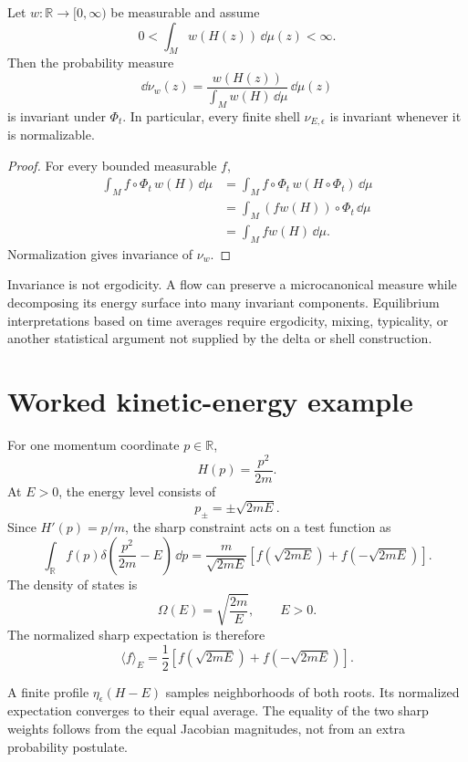 \documentclass[11pt]{article}
\begin{document}
\begin{theorem}
\label{thm:invariance}
Let \(w:\mathbb R\to[0,\infty)\) be measurable and assume
\[
0<\int_M w(H(z))\,\dd\mu(z)<\infty.
\]
Then the probability measure
\[
\dd\nu_w(z)
=
\frac{w(H(z))}
{\int_Mw(H)\,\dd\mu}\,\dd\mu(z)
\]
is invariant under \(\Phi_t\). In particular, every finite shell
\(\nu_{E,\epsilon}\) is invariant whenever it is normalizable.
\end{theorem}

\begin{proof}
For every bounded measurable \(f\),
\begin{align*}
\int_M f\circ\Phi_t\,w(H)\,\dd\mu
&=
\int_M f\circ\Phi_t\,w(H\circ\Phi_t)\,\dd\mu\\
&=
\int_M (fw(H))\circ\Phi_t\,\dd\mu\\
&=
\int_M fw(H)\,\dd\mu.
\end{align*}
Normalization gives invariance of \(\nu_w\).
\end{proof}

Invariance is not ergodicity. A flow can preserve a microcanonical measure
while decomposing its energy surface into many invariant components.
Equilibrium interpretations based on time averages require ergodicity,
mixing, typicality, or another statistical argument not supplied by the delta
or shell construction.

\section{Worked kinetic-energy example}

For one momentum coordinate \(p\in\mathbb R\),
\[
H(p)=\frac{p^2}{2m}.
\]
At \(E>0\), the energy level consists of
\[
p_\pm=\pm\sqrt{2mE}.
\]
Since \(H'(p)=p/m\), the sharp constraint acts on a test function as
\[
\int_{\mathbb R}
f(p)\delta\!\left(\frac{p^2}{2m}-E\right)\,\dd p
=
\frac{m}{\sqrt{2mE}}
\left[
f(\sqrt{2mE})+f(-\sqrt{2mE})
\right].
\]
The density of states is
\[
\Omega(E)
=
\sqrt{\frac{2m}{E}},
\qquad E>0.
\]
The normalized sharp expectation is therefore
\[
\langle f\rangle_E
=
\frac12
\left[
f(\sqrt{2mE})+f(-\sqrt{2mE})
\right].
\]

A finite profile \(\eta_\epsilon(H-E)\) samples neighborhoods of both roots.
Its normalized expectation converges to their equal average. The equality of
the two sharp weights follows from the equal Jacobian magnitudes, not from an
extra probability postulate.
\end{document}
